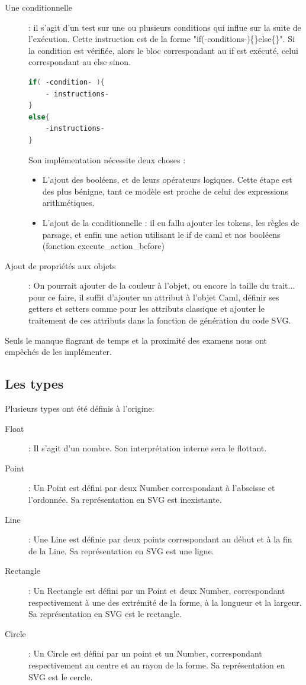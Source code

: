\documentclass[11pt]{report} %
\begin{document}
\begin{description}
  \item[Une conditionnelle]: il s'agit d'un test sur une ou plusieurs conditions qui influe sur la suite de l'exécution. Cette instruction est de la forme "if(-conditions-)\{\}else\{\}". Si la condition est vérifiée, alors le bloc correspondant au if est exécuté, celui correspondant au else sinon.

\begin{minipage}{\linewidth}
\begin{lstlisting}[caption=Conditionnelle, language=C]
if( -condition- ){
	- instructions-
}
else{
	-instructions-
}
\end{lstlisting}

Son implémentation nécessite deux choses : 
\begin{itemize}
\item L'ajout des booléens, et de leurs opérateurs logiques. Cette étape est des plus bénigne, tant ce modèle est proche de celui des expressions arithmétiques.
\item L'ajout de la conditionnelle : il eu fallu ajouter les tokens, les règles de parsage, et enfin une action utilisant le if de caml et nos booléens (fonction execute\_action\_before)
\end{itemize}
\end{minipage}

\item[Ajout de propriétés aux objets]: On pourrait ajouter de la couleur à l'objet, ou encore la taille du trait... pour ce faire, il suffit d'ajouter un attribut à l'objet Caml, définir ses getters et setters comme pour les attributs classique et ajouter le traitement de ces attributs dans la fonction de génération du code SVG.

\end{description}
Seuls le manque flagrant de temps et la proximité des examens nous ont empêchés de les implémenter.

\subsection{Les types}
Plusieurs types ont été définis à l'origine:
\begin{description}
\item[Float]: Il s'agit d'un nombre. Son interprétation interne sera le flottant.
\item[Point]: Un Point est défini par deux Number correspondant à l'abscisse et l'ordonnée. Sa représentation en SVG est inexistante.
\item[Line]: Une Line est définie par deux points correspondant au début et à la fin de la Line. Sa représentation en SVG est une ligne.
\item[Rectangle]: Un Rectangle est défini par un Point et deux Number, correspondant respectivement à une des extrémité de la forme, à la longueur et la largeur. Sa représentation en SVG est le rectangle.
\item[Circle]: Un Circle est défini par un point et un Number, correspondant respectivement au centre et au rayon de la forme. Sa représentation en SVG est le cercle.
\end{description}
\end{document}

